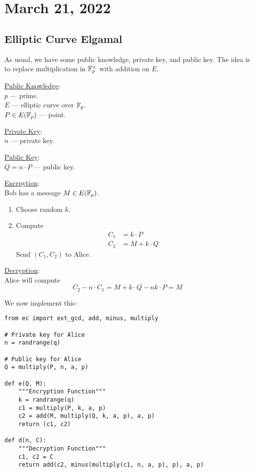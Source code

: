 \section{March 21, 2022}
\subsection{Elliptic Curve Elgamal}
As usual, we have some public knowledge, private key, and public key. The idea  is to replace multiplication in $\mathbb F_p^\times$ with addition on $E$.
\begin{mdframed}
    \ul{Public Knowledge}: \\
    $p$ --- prime. \\
    $E$ --- elliptic curve over $\mathbb F_p$. \\
    $P \in E(\mathbb F_p)$ --- point.

    \ul{Private Key}: \\
    $n$ --- private key.

    \ul{Public Key}: \\
    $Q = n\cdot P$ --- public key.

    \ul{Encrpytion}: \\
    Bob has a message $M\in E(\mathbb F_p)$.
    \begin{enumerate}
        \item Choose random $k$.
        \item Compute
              \begin{align*}
                  C_1 & = k\cdot P     \\
                  C_2 & = M + k\cdot Q
              \end{align*}
              Send $(C_1, C_2)$ to Alice.
    \end{enumerate}

    \ul{Decryption}: \\
    Alice will compute
    \[C_2 - n\cdot C_1 = M + k\cdot Q - nk\cdot P = M\]
\end{mdframed}

We now implement this:

\begin{lstlisting}
from ec import ext_gcd, add, minus, multiply

# Private key for Alice
n = randrange(q)

# Public key for Alice
Q = multiply(P, n, a, p)

def e(Q, M):
    """Encryption Function"""
    k = randrange(q)
    c1 = multiply(P, k, a, p)
    c2 = add(M, multiply(Q, k, a, p), a, p)
    return (c1, c2)

def d(n, C):
    """Decryption Function"""
    c1, c2 = C
    return add(c2, minus(multiply(c1, n, a, p), p), a, p)
\end{lstlisting}

